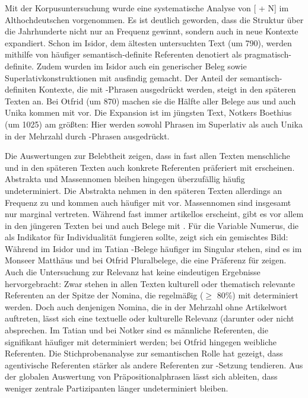 Mit der Korpusuntersuchung wurde eine systematische Analyse von [ + N] im Althochdeutschen vorgenommen. Es ist deutlich geworden, dass die Struktur über die Jahrhunderte nicht nur an Frequenz gewinnt, sondern auch in neue Kontexte expandiert. Schon im Isidor, dem ältesten untersuchten Text (um 790), werden mithilfe von  häufiger semantisch-definite Referenten denotiert als pragmatisch-definite. Zudem wurden im Isidor auch ein generischer Beleg sowie Superlativkonstruktionen mit  ausfindig gemacht. Der Anteil der semantisch-definiten Kontexte, die mit -Phrasen ausgedrückt werden, steigt in den späteren Texten an. Bei Otfrid (um 870) machen sie die Hälfte aller Belege aus und auch Unika kommen mit  vor. Die Expansion ist im jüngsten Text, Notkers Boethius (um 1025) am größten: Hier werden sowohl Phrasen im Superlativ als auch Unika in der Mehrzahl durch -Phrasen ausgedrückt.

Die Auswertungen zur Belebtheit zeigen, dass in fast allen Texten menschliche und in den späteren Texten auch konkrete Referenten präferiert mit  erscheinen. Abstrakta und Massennomen bleiben hingegen überzufällig häufig undeterminiert. Die Abstrakta nehmen in den späteren Texten allerdings an Frequenz zu und kommen auch häufiger mit  vor. Massennomen sind insgesamt nur marginal vertreten. Während   fast immer artikellos erscheint, gibt es vor allem in den jüngeren Texten bei  und  auch Belege mit . Für die Variable Numerus, die als Indikator für Individualität fungieren sollte, zeigt sich ein gemischtes Bild:  Während im Isidor und im Tatian -Belege häufiger im Singular stehen, sind es im Monseer Matthäus und bei Otfrid Pluralbelege, die eine Präferenz für  zeigen. Auch die Untersuchung zur Relevanz hat keine eindeutigen Ergebnisse hervorgebracht: Zwar stehen in allen Texten kulturell oder thematisch relevante Referenten an der Spitze der Nomina, die regelmäßig ($\geq$ 80\%) mit  determiniert werden. Doch auch denjenigen Nomina, die in der Mehrzahl ohne Artikelwort auftreten, lässt sich eine textuelle oder kulturelle Relevanz (darunter  oder  nicht absprechen. Im Tatian und bei Notker sind es männliche Referenten, die signifikant häufiger mit  determiniert werden; bei Otfrid hingegen weibliche Referenten. Die Stichprobenanalyse zur semantischen Rolle hat gezeigt, dass agentivische Referenten stärker als andere Referenten zur -Setzung tendieren. Aus der globalen Auswertung von Präpositionalphrasen lässt sich ableiten, dass weniger zentrale Partizipanten länger undeterminiert bleiben. 


